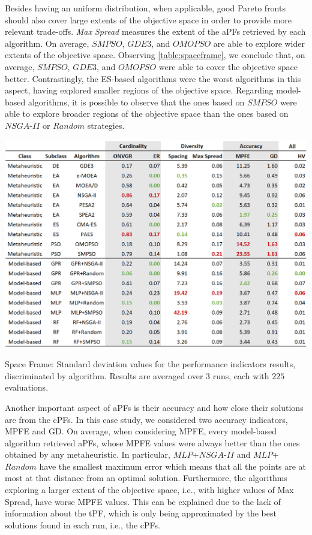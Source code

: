 Besides having an uniform distribution, when applicable, good Pareto fronts should also cover large extents of the objective space in order to provide more relevant trade-offs. \textit{Max Spread} measures the extent of the \acp{aPF} retrieved by each algorithm. On average, $SMPSO$, $GDE3$, and $OMOPSO$ are able to explore wider extents of the objective space. Observing \cref{table:spaceframe}, we conclude that, on average, $SMPSO$, $GDE3$, and $OMOPSO$ were able to cover the objective space better. Contrastingly, the \ac{ES}-based algorithms were the worst algorithms in this aspect, having explored smaller regions of the objective space. Regarding model-based algorithms, it is possible to observe that the ones based on $SMPSO$ were able to explore broader regions of the objective space than the ones based on $NSGA$-$II$ or $Random$ strategies. 
\begin{table}[]
	\centering
	\includegraphics[width=\textwidth]{Images/Evaluation/caadria/Results_Std_20190428.PNG}
	\caption[Space Frame: Standard deviation values for the performance indicators results, discriminated by each algorithm]{Space Frame: Standard deviation values for the performance indicators results, discriminated by algorithm. Results are averaged over $3$ runs, each with $225$ evaluations.}
	\label{table:spaceframestd}
\end{table}

Another important aspect of \acp{aPF} is their accuracy and how close their solutions are from the \acp{cPF}. In this case study, we considered two accuracy indicators, \ac{MPFE} and \ac{GD}. On average, when considering \ac{MPFE}, every model-based algorithm retrieved \acp{aPF}, whose \ac{MPFE} values were always better than the ones obtained by any metaheuristic. In particular, $MLP$+$NSGA$-$II$ and $MLP$+$Random$ have the smallest maximum error which means that all the points are at most at that distance from an optimal solution. Furthermore, the algorithms exploring a larger extent of the objective space, i.e., with higher values of Max Spread, have worse \ac{MPFE} values. This can be explained due to the lack of information about the \ac{tPF}, which is only being approximated by the best solutions found in each run, i.e., the \acp{cPF}. 

